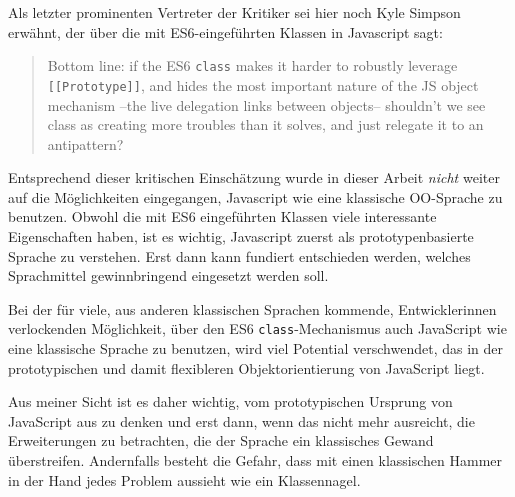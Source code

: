 Als letzter prominenten Vertreter der Kritiker sei hier noch Kyle Simpson erwähnt, der über die mit ES6-eingeführten Klassen in Javascript sagt:
\begin{quote}
Bottom line: if the ES6 \texttt{class} makes it harder to robustly leverage 
\texttt{[[Prototype]]}, and hides the most important nature of the JS object 
mechanism --the live delegation links between objects-- shouldn’t we 
see class as creating more troubles than it solves, and just relegate it
to an antipattern? \citep[p. 153]{SimpsonThisobjectprototypes2014}
\end{quote}

\skippingparagraph
Entsprechend dieser kritischen Einschätzung wurde in dieser Arbeit \emph{nicht} weiter auf die Möglichkeiten eingegangen, Javascript wie eine klassische OO-Sprache zu benutzen. 
Obwohl die mit ES6 eingeführten Klassen viele interessante Eigenschaften haben, ist es wichtig, Javascript zuerst als prototypenbasierte Sprache zu verstehen. Erst dann kann fundiert entschieden werden, welches Sprachmittel gewinnbringend eingesetzt werden soll.

Bei der für viele, aus anderen klassischen Sprachen kommende, Entwicklerinnen verlockenden Möglichkeit, über den ES6 \texttt{class}-Mechanismus auch JavaScript wie eine klassische Sprache zu benutzen, wird viel Potential verschwendet, das in der prototypischen und damit flexibleren Objektorientierung von JavaScript liegt.

Aus meiner Sicht ist es daher wichtig, vom prototypischen Ursprung von JavaScript aus zu denken und erst dann, wenn das nicht mehr ausreicht, die Erweiterungen zu betrachten, die der Sprache ein klassisches Gewand überstreifen. Andernfalls besteht die Gefahr, dass mit einen klassischen Hammer in der Hand jedes Problem aussieht wie ein Klassennagel.
